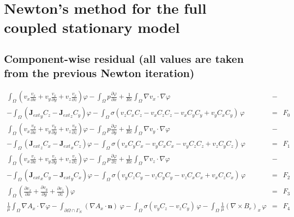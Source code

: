 \documentclass[smallextended]{svjour3}       %
\begin{document}
		\section{Newton's method for the full coupled stationary model}
		\subsection{Component-wise residual (all values are taken from the previous Newton iteration)}
		\begin{eqnarray}
			\int_{\Omega} \left({v_x} \frac{v_x}{\partial x} + v_y \frac{v_x}{\partial y} + v_z \frac{v_x}{\partial z}\right) \varphi
			- \int_{\Omega} p \frac{\partial \varphi}{\partial x}
			+ \frac{1}{Re} \int_{\Omega} \nabla v_x \cdot \nabla \varphi
			\nonumber & -\\
			- \int_{\Omega} \left({\mathbf{J}_{ext}}_y C_z - {\mathbf{J}_{ext}}_z C_y\right) \varphi			
			- \int_{\Omega} \sigma \left(v_z C_x C_z - v_x C_z C_z - v_x C_y C_y + v_y C_x C_y\right)\, \varphi
			& = & F_0\nonumber \\
			\int_{\Omega} \left(v_x \frac{v_y}{\partial x} + v_y \frac{v_y}{\partial y} + v_z \frac{v_y}{\partial z}\right) \varphi
			- \int_{\Omega} p \frac{\partial \varphi}{\partial y}
			+ \frac{1}{Re} \int_{\Omega} \nabla v_y \cdot \nabla \varphi
			\nonumber & -\\
			- \int_{\Omega} \left({\mathbf{J}_{ext}}_z C_x - {\mathbf{J}_{ext}}_x C_z\right) \varphi			
			- \int_{\Omega} \sigma \left(v_x C_y C_x - v_y C_x C_x - v_y C_z C_z + v_z C_y C_z\right)\, \varphi
			& = & F_1\nonumber \\
			\int_{\Omega} \left(v_x \frac{v_z}{\partial x} + v_y \frac{v_z}{\partial y} + v_z \frac{v_z}{\partial z}\right) \varphi
			- \int_{\Omega} p \frac{\partial \varphi}{\partial z}
			+ \frac{1}{Re} \int_{\Omega} \nabla v_z \cdot \nabla \varphi
			\nonumber & -\\
			- \int_{\Omega} \left({\mathbf{J}_{ext}}_x C_y - {\mathbf{J}_{ext}}_y C_x\right) \varphi			
			- \int_{\Omega} \sigma \left(v_y C_z C_y - v_z C_y C_y - v_z C_x C_x + v_x C_z C_x\right)\, \varphi
			& = & F_2\nonumber \\			
			\int_{\Omega} \left(\frac{\partial v_x}{\partial x} + \frac{\partial v_y}{\partial y} + \frac{\partial v_z}{\partial z}\right) \varphi & = & F_3\nonumber \\
			\frac{1}{\mu}\int_{\Omega}\nabla A_x \cdot \nabla \varphi - \int_{\partial \Omega \cap \Gamma_{N}} \left(\nabla A_x\cdot \mathbf{n}\right)\ \varphi 
			 - \int_{\Omega} \sigma \left(v_y C_z - v_z C_y\right)\,\varphi -\int_{\Omega}\frac{1}{\mu} \left(\nabla \times B_r \right)_x\,\varphi & = & F_4\nonumber \\

\end{eqnarray}
\end{document}
